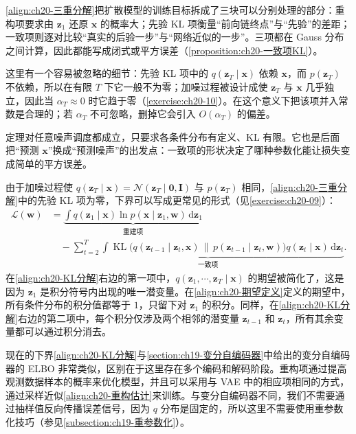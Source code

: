 \documentclass[../../main.tex]{subfiles}
\begin{document}
\begin{remark}
\eqref{align:ch20-三重分解}把扩散模型的训练目标拆成了三块可以分别处理的部分：重构项要求由 $\bm{z}_1$ 还原 $\bm{x}$ 的概率大；先验 KL 项衡量“前向链终点”与“先验”的差距；一致项则逐对比较“真实的后验一步”与“网络近似的一步”。三项都在 Gauss 分布之间计算，因此都能写成闭式或平方误差（\cref{proposition:ch20-一致项KL}）。\par
这里有一个容易被忽略的细节：先验 KL 项中的 $q(\bm{z}_T\mid\bm{x})$ 依赖 $\bm{x}$，而 $p(\bm{z}_T)$ 不依赖，所以在有限 $T$ 下它一般不为零；加噪过程被设计成使 $\bm{z}_T$ 与 $\bm{x}$ 几乎独立，因此当 $\alpha_T\approx0$ 时它趋于零（\cref{exercise:ch20-10}）。在这个意义下把该项并入常数是合理的；若 $\alpha_T$ 不可忽略，删掉它会引入 $O(\alpha_T)$ 的偏差。\par
定理对任意噪声调度都成立，只要求各条件分布有定义、KL 有限。它也是后面把“预测 $\bm{x}$”换成“预测噪声”的出发点：一致项的形状决定了哪种参数化能让损失变成简单的平方误差。
\end{remark}

由于加噪过程使 $q(\bm{z}_T\mid\bm{x})=\mathcal{N}(\bm{z}_T\mid\bm{0},\bm{I})$ 与 $p(\bm{z}_T)$ 相同，\eqref{align:ch20-三重分解}中的先验 KL 项为零，下界可以写成更常见的形式（见\cref{exercise:ch20-09}）：
\begin{align}
\mathcal{L}(\bm{w})&=\underbrace{\int q(\bm{z}_1\mid\bm{x})\ln p(\bm{x}\mid\bm{z}_1,\bm{w})\,\mathrm{d}\bm{z}_1}_{\text{重建项}}\nonumber\\
&\quad-\underbrace{\sum_{t=2}^{T}\int\operatorname{KL}\big(q(\bm{z}_{t-1}\mid\bm{z}_t,\bm{x})\,\|\,p(\bm{z}_{t-1}\mid\bm{z}_t,\bm{w})\big)q(\bm{z}_t\mid\bm{x})\,\mathrm{d}\bm{z}_t}_{\text{一致项}}.
\label{align:ch20-KL分解}
\end{align}
在\eqref{align:ch20-KL分解}右边的第一项中，$q(\bm{z}_1,\cdots,\bm{z}_T\mid\bm{x})$ 的期望被简化了，这是因为 $\bm{z}_1$ 是积分符号内出现的唯一潜变量。在\eqref{align:ch20-期望定义}定义的期望中，所有条件分布的积分值都等于 $1$，只留下对 $\bm{z}_1$ 的积分。同样，在\eqref{align:ch20-KL分解}右边的第二项中，每个积分仅涉及两个相邻的潜变量 $\bm{z}_{t-1}$ 和 $\bm{z}_t$，所有其余变量都可以通过积分消去。

现在的下界\eqref{align:ch20-KL分解}与\cref{section:ch19-变分自编码器}中给出的变分自编码器的 ELBO 非常类似，区别在于这里存在多个编码和解码阶段。重构项通过提高观测数据样本的概率来优化模型，并且可以采用与 VAE 中的相应项相同的方式，通过采样近似\eqref{align:ch20-重构估计}来训练。与变分自编码器不同，我们不需要通过抽样值反向传播误差信号，因为 $q$ 分布是固定的，所以这里不需要使用重参数化技巧（参见\cref{subsection:ch19-重参数化}）。
\end{document}
